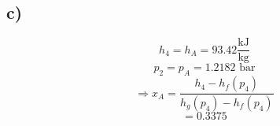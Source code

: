 

\subsection*{c)}
\[
h_4 = h_{A} = 93.42 \frac{\text{kJ}}{\text{kg}}
\]
\[
p_2 = p_{A} = 1.2182 \text{ bar}
\]
\[
\Rightarrow x_{A} = \frac{h_4 - h_f(p_4)}{h_g(p_4) - h_f(p_4)}
\]
\[
= 0.3375
\]